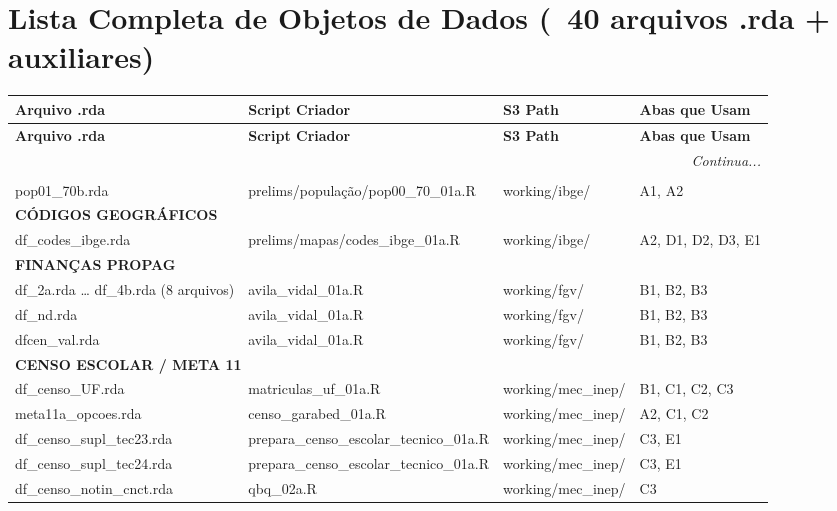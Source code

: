 \documentclass[10pt]{article}
\begin{document}
	\newpage
	
	\section*{Lista Completa de Objetos de Dados (~40 arquivos .rda + auxiliares)}
	
	\footnotesize
	\setlength{\LTleft}{0pt}
	\setlength{\tabcolsep}{3pt}
	\renewcommand{\arraystretch}{1.3}
	
	\begin{longtable}{p{4.5cm}p{5.5cm}p{4.5cm}p{7cm}}
		\toprule
		\textbf{Arquivo .rda} & \textbf{Script Criador} & \textbf{S3 Path} & \textbf{Abas que Usam} \\
		\midrule
		\endfirsthead
		\toprule
		\textbf{Arquivo .rda} & \textbf{Script Criador} & \textbf{S3 Path} & \textbf{Abas que Usam} \\
		\midrule
		\endhead
		\midrule
		\multicolumn{4}{r}{\textit{Continua...}} \\
		\endfoot
		\bottomrule
		\endlastfoot
		
		\multicolumn{4}{l}{\cellcolor{tabA!20}\textbf{DEMOGRAFIA}} \\
		pop01\_70b.rda & prelims/população/pop00\_70\_01a.R & working/ibge/ & A1, A2 \\
		
		\multicolumn{4}{l}{\cellcolor{tabA!20}\textbf{CÓDIGOS GEOGRÁFICOS}} \\
		df\_codes\_ibge.rda & prelims/mapas/codes\_ibge\_01a.R & working/ibge/ & A2, D1, D2, D3, E1 \\
		
		\multicolumn{4}{l}{\cellcolor{tabB!20}\textbf{FINANÇAS PROPAG}} \\
		df\_2a.rda \ldots{} df\_4b.rda (8 arquivos) & avila\_vidal\_01a.R & working/fgv/ & B1, B2, B3 \\
		df\_nd.rda & avila\_vidal\_01a.R & working/fgv/ & B1, B2, B3 \\
		dfcen\_val.rda & avila\_vidal\_01a.R & working/fgv/ & B1, B2, B3 \\
		
		\multicolumn{4}{l}{\cellcolor{tabC!20}\textbf{CENSO ESCOLAR / META 11}} \\
		df\_censo\_UF.rda & matriculas\_uf\_01a.R & working/mec\_inep/ & B1, C1, C2, C3 \\
		meta11a\_opcoes.rda & censo\_garabed\_01a.R & working/mec\_inep/ & A2, C1, C2 \\
		df\_censo\_supl\_tec23.rda & prepara\_censo\_escolar\_tecnico\_01a.R & working/mec\_inep/ & C3, E1 \\
		df\_censo\_supl\_tec24.rda & prepara\_censo\_escolar\_tecnico\_01a.R & working/mec\_inep/ & C3, E1 \\
		df\_censo\_notin\_cnct.rda & qbq\_02a.R & working/mec\_inep/ & C3 \\
		

\end{longtable}
\end{document}
